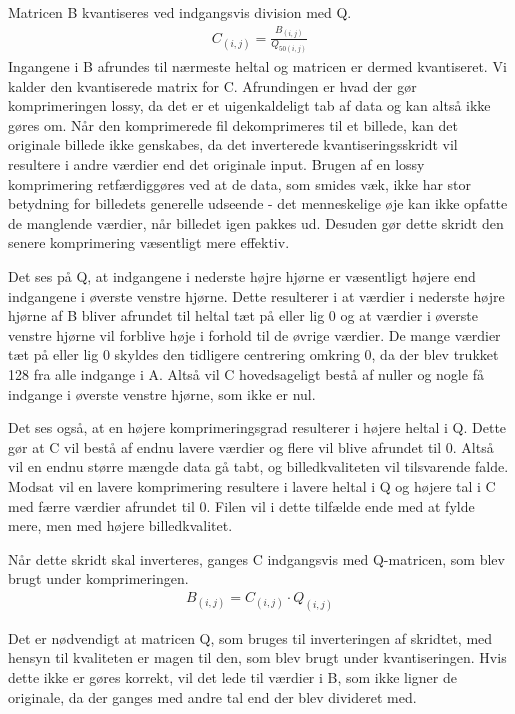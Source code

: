 Matricen B kvantiseres ved indgangsvis division med Q.
\begin{align}
C_{(i,j)}=\frac{B_{(i,j)}}{Q_{50(i,j)}}
\end{align}
Ingangene i B afrundes til nærmeste heltal og matricen er dermed kvantiseret. Vi kalder den kvantiserede matrix for C. Afrundingen er hvad der gør komprimeringen lossy, da det er et uigenkaldeligt tab af data og kan altså ikke gøres om. Når den komprimerede fil dekomprimeres til et billede, kan det originale billede ikke genskabes, da det inverterede kvantiseringsskridt vil resultere i andre værdier end det originale input. Brugen af en lossy komprimering retfærdiggøres ved at de data, som smides væk, ikke har stor betydning for billedets generelle udseende - det menneskelige øje kan ikke opfatte de manglende værdier, når billedet igen pakkes ud. Desuden gør dette skridt den senere komprimering væsentligt mere effektiv.

Det ses på Q, at indgangene i nederste højre hjørne er væsentligt højere end indgangene i øverste venstre hjørne. Dette resulterer i at værdier i nederste højre hjørne af B bliver afrundet til heltal tæt på eller lig 0 og at værdier i øverste venstre hjørne vil forblive høje i forhold til de øvrige værdier. De mange værdier tæt på eller lig 0 skyldes den tidligere centrering omkring 0, da der blev trukket 128 fra alle indgange i A. Altså vil C hovedsageligt bestå af nuller og nogle få indgange i øverste venstre hjørne, som ikke er nul.
					
Det ses også, at en højere komprimeringsgrad resulterer i højere heltal i Q. Dette gør at C vil bestå af endnu lavere værdier og flere vil blive afrundet til 0. Altså vil en endnu større mængde data gå tabt, og billedkvaliteten vil tilsvarende falde. Modsat vil en lavere komprimering resultere i lavere heltal i Q og højere tal i C med færre værdier afrundet til 0. Filen vil i dette tilfælde ende med at fylde mere, men med højere billedkvalitet.

Når dette skridt skal inverteres, ganges C indgangsvis med Q-matricen, som blev brugt under komprimeringen.
\begin{align}
B_{(i,j)}=C_{(i,j)} \cdot Q_{(i,j)}
\end{align}

Det er nødvendigt at matricen Q, som bruges til inverteringen af skridtet, med hensyn til kvaliteten er magen til den, som blev brugt under kvantiseringen. Hvis dette ikke er gøres korrekt, vil det lede til værdier i B, som ikke ligner de originale, da der ganges med andre tal end der blev divideret med.

